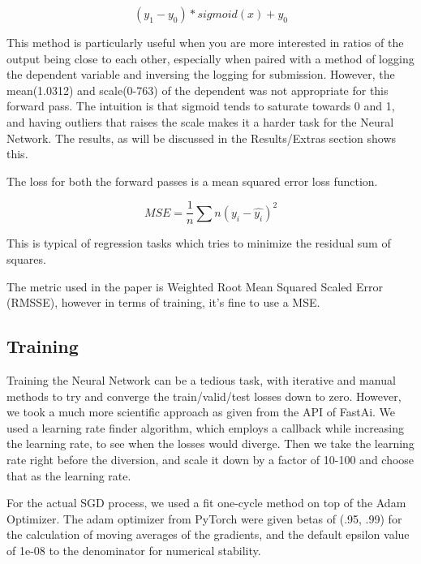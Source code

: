 \documentclass[10pt,twocolumn,letterpaper]{article}
\begin{document}
\begin{equation}
  (y_1 - y_0) * sigmoid(x) + y_0
  \label{newEqn}
\end{equation}

  This method is particularly useful when you are more interested in ratios of
  the output being close to each other, especially when paired with a method of
  logging the dependent variable and inversing the logging for submission.
  However, the mean(1.0312) and scale(0-763) of the dependent was not
  appropriate for this forward pass. The intuition is that sigmoid tends to
  saturate towards 0 and 1, and having outliers that raises the scale makes it a
  harder task for the Neural Network. The results, as will be discussed in the
  Results/Extras section shows this.

  The loss for both the forward passes is a mean squared error loss function.

  \begin{equation}
    MSE = \frac{1}{n}\sum{n} (y_i - \hat{y_i})^2
    \label{newEqn}
  \end{equation}

  This is typical of regression tasks which tries to minimize the residual sum
  of squares.

  The metric used in the paper is Weighted Root Mean Squared Scaled Error
  (RMSSE), however in terms of training, it’s fine to use a MSE.

\subsection{Training}
  Training the Neural Network can be a tedious task, with iterative and manual
  methods to try and converge the train/valid/test losses down to zero. However,
  we took a much more scientific approach as given from the API of FastAi. We
  used a learning rate finder algorithm, which employs a callback while
  increasing the learning rate, to see when the losses would diverge. Then we
  take the learning rate right before the diversion, and scale it down by a
  factor of 10-100 and choose that as the learning rate.

  For the actual SGD process, we used a fit one-cycle method on top of the Adam
  Optimizer. The adam optimizer from PyTorch were given betas of (.95, .99) for
  the calculation of moving averages of the gradients, and the default epsilon
  value of 1e-08 to the denominator for numerical stability.

\end{document}
